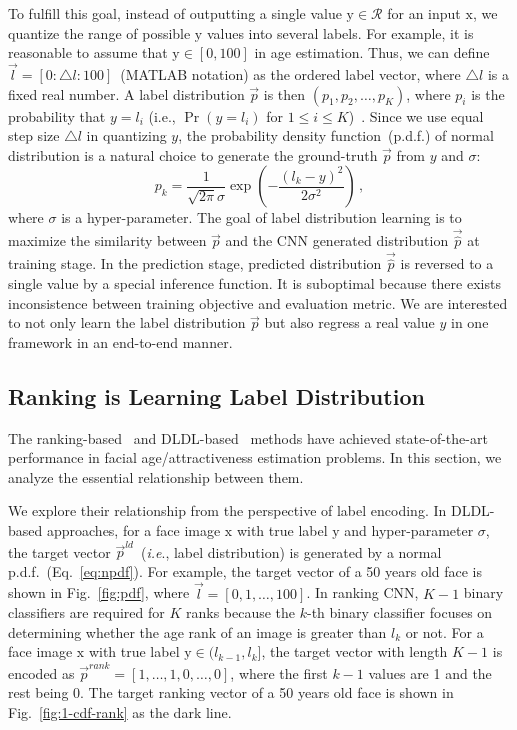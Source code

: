 \documentclass[5p,times,twocolumn]{elsarticle}
\makeatletter
\DeclareRobustCommand\onedot{\@onedot}
\def\@onedot{.}
\def\ie{\emph{i.e}\onedot}
\makeatother
\begin{document}
To fulfill this goal, instead of outputting a single value $\mathrm y \in \mathcal R$  for an input $\mathrm x$, we quantize the range of possible $\mathrm y$ values into several labels. For example, it is reasonable to assume that $\mathrm y \in [0,100]$ in age estimation. Thus, we can define $\vec l= [0:\bigtriangleup l:100]$~(MATLAB notation) as the ordered label vector, where $\bigtriangleup l$ is a fixed real number. A label distribution $\vec p$ is then $(p_1, p_2, \ldots, p_K)$, where $p_i$ is the probability that $y = l_i$ (i.e., $\Pr(y = l_i )$ for $1 \leq i \leq K$)~\cite{gao2017deep}. Since we use equal step size $\bigtriangleup l$ in quantizing $y$, the probability density function~(p.d.f.) of normal distribution is a natural choice to generate the ground-truth $\vec p$ from $y$ and $\sigma$:
\begin{equation}
 p_k = \frac{1}{\sqrt{2\pi}\sigma} \exp\left( -\frac{(l_k-y)^2}{2 \sigma^2} \right) \,,  \label{eq:npdf}
\end{equation}
where $\sigma$ is a hyper-parameter. The goal of label distribution learning is to maximize the similarity between $\vec p$ and the CNN generated distribution $\vec {\hat p}$ at training stage. In the prediction stage, predicted distribution $\vec {\hat p}$ is reversed to a single value by a special inference function. It is suboptimal because there exists inconsistence between training objective and evaluation metric. We are  interested to not only learn the label distribution $\vec p$ but also regress a real value $y$ in one framework in an end-to-end manner.

\subsection{Ranking is Learning Label Distribution}\label{subsec:rem}
The ranking-based~\cite{niu2016ordinal,chen2017using,Chen2017Deep} and DLDL-based~\cite{gao2017deep,shen2017deep,shen2017label,fan2017label} methods have achieved state-of-the-art performance in facial age/attractiveness estimation problems. In this section, we analyze the essential relationship between them. 

We explore their relationship from the perspective of label encoding. In DLDL-based approaches, for a face image $\mathrm x$ with true label $\mathrm y$ and hyper-parameter $\sigma$, the target vector $\vec p^{ld}$~(\ie, label distribution) is generated by a normal p.d.f.~(Eq.~\eqref{eq:npdf}). For example, the target vector of a 50 years old face is shown in Fig.~\ref{fig:pdf}, where $\vec l =[0,1,\ldots, 100]$. In ranking CNN, $K-1$ binary classifiers are required for $K$ ranks because the $k$-th binary classifier focuses on determining whether the age rank of an image is greater than $l_k$ or not. For a face image $\mathrm x$ with true label $\mathrm y \in (l_{k-1}, l_k]$, the target vector with length $K-1$ is encoded as $\vec p^{rank} =[1,\ldots,1,0,\ldots, 0]$, where the first $k-1$ values are 1 and the rest being 0. The target ranking vector of a 50 years old face is shown in Fig.~\ref{fig:1-cdf-rank} as the dark line. 
\end{document}
